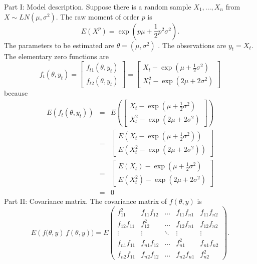 \documentclass{article}
\begin{document}
Part I: Model description. Suppose there is a random sample $X_{1},\ldots
,X_{n}$ from $X\sim LN(\mu ,\sigma ^{2})$. The raw moment of order $p$ is%
\begin{equation*}
E\left( X^{p}\right) =\exp \left( p\mu +\frac{1}{2}p^{2}\sigma ^{2}\right) .
\end{equation*}%
The parameters to be estimated are $\theta =\left( \mu ,\sigma ^{2}\right) $%
. The observations are $y_{t}=X_{t}$. The elementary zero functions are%
\begin{equation*}
f_{t}\left( \theta ,y_{t}\right) =\left[
\begin{array}{c}
f_{t1}\left( \theta ,y_{t}\right) \\
f_{t2}\left( \theta ,y_{t}\right)%
\end{array}%
\right] =\left[
\begin{array}{c}
X_{t}-\exp \left( \mu +\frac{1}{2}\sigma ^{2}\right) \\
X_{t}^{2}-\exp \left( 2\mu +2\sigma ^{2}\right)%
\end{array}%
\right]
\end{equation*}%
because%
\begin{eqnarray*}
E\left( f_{t}\left( \theta ,y_{t}\right) \right) &=&E\left( \left[
\begin{array}{c}
X_{t}-\exp \left( \mu +\frac{1}{2}\sigma ^{2}\right) \\
X_{t}^{2}-\exp \left( 2\mu +2\sigma ^{2}\right)%
\end{array}%
\right] \right) \\
&=&\left[
\begin{array}{c}
E\left( X_{t}-\exp \left( \mu +\frac{1}{2}\sigma ^{2}\right) \right) \\
E\left( X_{t}^{2}-\exp \left( 2\mu +2\sigma ^{2}\right) \right)%
\end{array}%
\right] \\
&=&\left[
\begin{array}{c}
E\left( X_{t}\right) -\exp \left( \mu +\frac{1}{2}\sigma ^{2}\right) \\
E\left( X_{t}^{2}\right) -\exp \left( 2\mu +2\sigma ^{2}\right)%
\end{array}%
\right] \\
&=&0
\end{eqnarray*}%
Part II: Covariance matrix. The covariance matrix of $f\left( \theta
,y\right) $ is%
\begin{equation*}
E\left( f(\theta ,y\right) \,f\left( \theta ,y\right) )=E\left(
\begin{array}{ccccc}
f_{11}^{2} & f_{11}f_{12} & \ldots & f_{11}f_{n1} & f_{11}f_{n2} \\
f_{12}f_{11} & f_{12}^{2} & \ldots & f_{12}f_{n1} & f_{12}f_{n2} \\
\vdots & \vdots & \ddots & \vdots & \vdots \\
f_{n1}f_{11} & f_{n1}f_{12} & \ldots & f_{n1}^{2} & f_{n1}f_{n2} \\
f_{n2}f_{11} & f_{n2}f_{12} & \ldots & f_{n2}f_{n1} & f_{n2}^{2}%
\end{array}%
\right) .
\end{equation*}%
\end{document}
